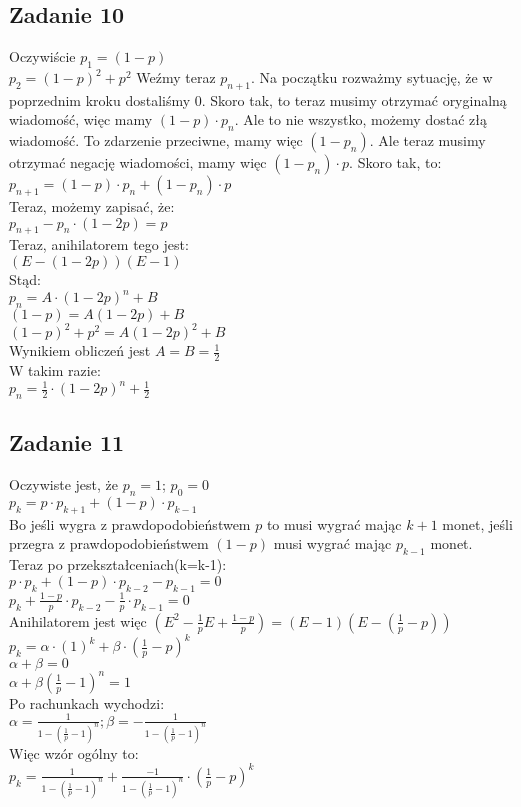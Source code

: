 \documentclass[a4paper]{article}
\begin{document}
\subsection*{Zadanie 10}
Oczywiście $p_1=(1-p)$\\
$p_2=(1-p)^2 + p^2$
Weźmy teraz $p_{n+1}$. Na początku rozważmy sytuację, że w poprzednim kroku dostaliśmy 0. Skoro tak, to teraz musimy otrzymać oryginalną wiadomość, więc mamy $(1-p)\cdot p_n$. Ale to nie wszystko, możemy dostać złą wiadomość. To zdarzenie przeciwne, mamy więc $(1-p_n)$. Ale teraz musimy otrzymać negację wiadomości, mamy więc $(1-p_n)\cdot p$. Skoro tak, to:\\
$p_{n+1} = (1-p)\cdot p_n + (1-p_n)\cdot p$\\
Teraz, możemy zapisać, że:\\
$p_{n+1}-p_n\cdot (1-2p)=p$\\
Teraz, anihilatorem tego jest:\\
$(E-(1-2p))(E-1)$\\
Stąd:\\
$p_n=A\cdot (1-2p)^n + B$\\
$(1-p)=A(1-2p) + B$\\
$(1-p)^2+p^2=A(1-2p)^2 + B$\\
Wynikiem obliczeń jest $A=B=\frac{1}{2}$\\
W takim razie:\\
$p_n=\frac{1}{2}\cdot (1-2p)^n + \frac{1}{2}$\\

\subsection*{Zadanie 11}
Oczywiste jest, że $p_n=1$; $p_0=0$\\
$p_k=p\cdot p_{k+1} + (1-p)\cdot p_{k-1}$\\
Bo jeśli wygra z prawdopodobieństwem $p$ to musi wygrać mając $k+1$ monet, jeśli przegra z prawdopodobieństwem $(1-p)$ musi wygrać mając $p_{k-1}$ monet.\\
Teraz po przekształceniach(k=k-1):\\
$p\cdot p_k + (1-p)\cdot p_{k-2}-p_{k-1}=0$\\
$p_k + \frac{1-p}{p} \cdot p_{k-2}-\frac{1}{p}\cdot p_{k-1}=0$\\
Anihilatorem jest więc $(E^2-\frac{1}{p}E+\frac{1-p}{p})=(E-1)(E-(\frac{1}{p}-p))$\\
$p_k=\alpha \cdot (1)^k + \beta \cdot (\frac{1}{p}-p)^k $\\
$\alpha+\beta=0$\\
$\alpha+\beta(\frac{1}{p}-1)^n=1$\\
Po rachunkach wychodzi:\\
\Large
$\alpha=\frac{1}{1-(\frac{1}{p}-1)^n}; \beta=-\frac{1}{1-(\frac{1}{p}-1)^n}$
\normalsize \\
Więc wzór ogólny to:\\
$p_k=\frac{1}{1-(\frac{1}{p}-1)^n} + \frac{-1}{1-(\frac{1}{p}-1)^n} \cdot (\frac{1}{p}-p)^k $\\
\end{document}
